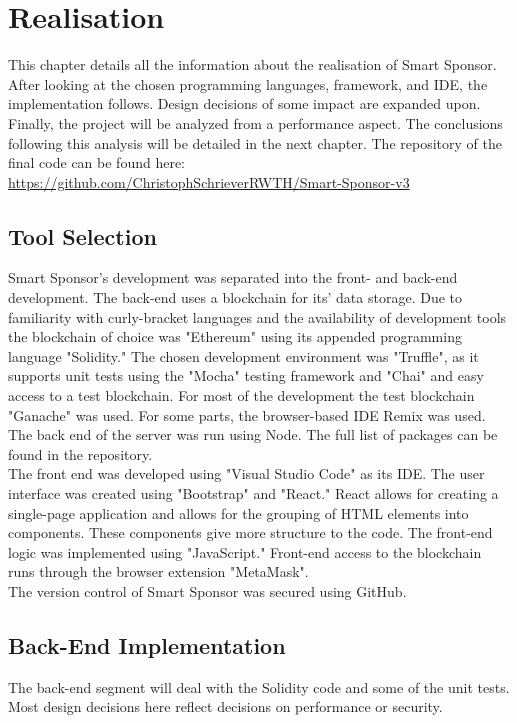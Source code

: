 \chapter{Realisation}
This chapter details all the information about the realisation of Smart Sponsor. After looking at the chosen programming languages, framework, and IDE, the implementation follows. Design decisions of some impact are expanded upon. Finally, the project will be analyzed from a performance aspect. The conclusions following this analysis will be detailed in the next chapter. The repository of the final code can be found here:
\url{https://github.com/ChristophSchrieverRWTH/Smart-Sponsor-v3}
\section{Tool Selection}
Smart Sponsor's development was separated into the front- and back-end development. The back-end uses a blockchain for its' data storage. Due to familiarity with curly-bracket languages and the availability of development tools the blockchain of choice was "Ethereum" using its appended programming language "Solidity." The chosen development environment was "Truffle", as it supports unit tests using the "Mocha" testing framework and "Chai" and easy access to a test blockchain. For most of the development the test blockchain "Ganache" was used. For some parts, the browser-based IDE Remix\cite{remix} was used. The back end of the server was run using Node. The full list of packages can be found in the repository.\\
The front end was developed using "Visual Studio Code" as its IDE. The user interface was created using "Bootstrap" and "React." React allows for creating a single-page application and allows for the grouping of HTML elements into components. These components give more structure to the code. The front-end logic was implemented using "JavaScript." Front-end access to the blockchain runs through the browser extension "MetaMask"\cite{meta}.\\
The version control of Smart Sponsor was secured using GitHub.
\section{Back-End Implementation}
The back-end segment will deal with the Solidity code and some of the unit tests. Most design decisions here reflect decisions on performance or security.
